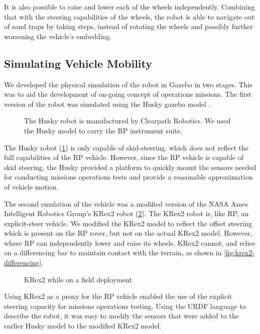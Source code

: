\documentclass[twocolumn,letterpaper]{IEEEAerospaceCLS}  %
\begin{document}
It is also possible to raise and lower each of the wheels independently. Combining that with the steering capabilities of the wheels, the robot is able to navigate out of sand traps by taking steps, instead of rotating the wheels and possibly further worsening the vehicle's embedding.

\subsection{Simulating Vehicle Mobility}
\label{sec:simulated-rover}

We developed the physical simulation of the robot in Gazebo in two stages. This was to aid the development of on-going concept of operations missions.  The first version of the robot was simulated using the Husky gazebo model \cite{gariepy2015husky}.  

\begin{figure}[htp]
\caption{The Husky robot is manufactured by Clearpath Robotics.  We used the Husky model to carry the RP instrument suite. \label{fig:husky}}
\end{figure}

The Husky robot (\cref{fig:husky}) is only capable of skid-steering, which does not reflect the full capabilities of the RP vehicle.  However, since the RP vehicle is capable of skid steering, the Husky provided a platform to quickly mount the sensors needed for conducting missions operations tests and provide a reasonable approximation of vehicle motion.  

The second emulation of the vehicle was a modified version of the NASA Ames Intelligent Robotics Group's KRex2 robot (\cref{fig:krex2}).  The KRex2 robot is, like RP, an explicit-steer vehicle.  We modified the KRex2 model to reflect the offset steering which is present on the RP rover, but not on the actual KRex2 model.  However, where RP can independently lower and raise its wheels, KRex2 cannot, and relies on a differencing bar to maintain contact with the terrain, as shown in \cref{fig:krex2-differencing}.    

\begin{figure}[htp]
\caption{KRex2 while on a field deployment \label{fig:krex2}}
\end{figure}

Using KRex2 as a proxy for the RP vehicle enabled the use of the explicit steering capacity for missions operations testing.  Using the URDF language to describe the robot, it was easy to modify the sensors that were added to the earlier Husky model to the modified KRex2 model.  
\end{document}
